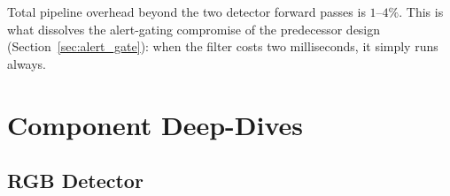Total pipeline overhead beyond the two detector forward passes is $1$--$4\%$. This is what dissolves the alert-gating compromise of the predecessor design (Section~\ref{sec:alert_gate}): when the filter costs two milliseconds, it simply runs always.

\section{Component Deep-Dives}
\label{sec:components_eval}

\subsection{RGB Detector}
\label{sec:rgb_results}

\begin{table}[htbp]
    \centering
    \caption{RGB variants on Svanstr\"om @ \texttt{imgsz=1280} (IoP@0.5, drone class; full 28{,}710 frames, the pre-protocol full-set run, internally consistent). Aggressive retraining destroys recall on small Svanstr\"om drones while leaving its own in-domain test performance intact.}
    \label{tab:rgb_comparison}
\end{table}

